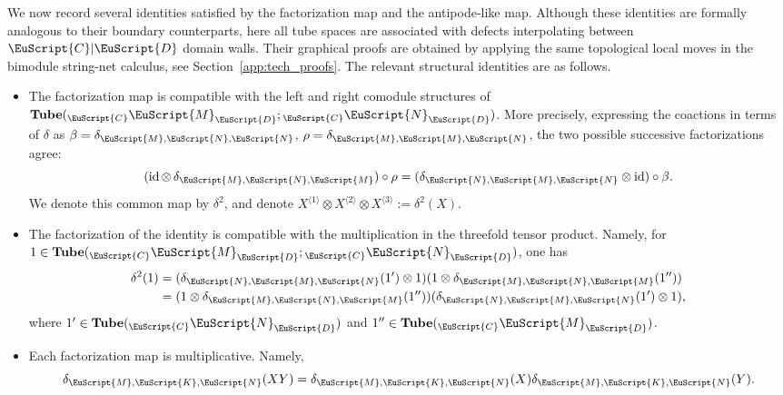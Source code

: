 \documentclass[a4paper,11pt]{article}
\theoremstyle{definition}
\theoremstyle{remark}
\newcommand\eC           {\EuScript{C}}
\newcommand\eD           {\EuScript{D}}
\newcommand\eK         {\EuScript{K}}
\newcommand\eM          {\EuScript{M}}
\newcommand\eN         {\EuScript{N}}
\newcommand{\id}{\operatorname{id}}
\newcommand{\Tube}{\mathbf{Tube}}
\begin{document}
We now record several identities satisfied by the factorization map and the antipode-like map. Although these identities are formally analogous to their boundary counterparts, here all tube spaces are associated with defects interpolating between $\eC|\eD$ domain walls. Their graphical proofs are obtained by applying the same topological local moves in the bimodule string-net calculus, see Section~\ref{app:tech_proofs}. The relevant structural identities are as follows.



\begin{itemize}
    \item
    The factorization map is compatible with the left and right comodule structures of $\Tube({}_{\eC}\eM_{\eD};{}_{\eC}\eN_{\eD})$. More precisely, expressing the coactions in terms of $\delta$ as $\beta = \delta_{\eM,\eN,\eN}$, $\rho = \delta_{\eM,\eM,\eN}$, the two possible successive factorizations agree:
    \begin{equation} \label{eq:coassociativity-DW}
        (\id\otimes\,\delta_{\eM,\eN,\eM})\circ\rho = (\delta_{\eN,\eM,\eN}\otimes\id)\circ\beta.
    \end{equation}
    We denote this common map by $\delta^2$, and denote $X^{\langle 1 \rangle} \otimes X^{\langle 2\rangle} \otimes X^{\langle 3\rangle} := \delta^2(X)$. 

    \item
    The factorization of the identity is compatible with the multiplication in the threefold tensor product. Namely, for $1\in \Tube({}_{\eC}\eM_{\eD};{}_{\eC}\eN_{\eD})$, one has
    \begin{equation} \label{eq:unit-trifold-DW}
    \begin{aligned}
         \delta^2(1)&=(\delta_{\eN,\eM,\eN}(1') \otimes 1) (1\otimes \delta_{\eM,\eN,\eM}(1''))\\
         &=(1\otimes \delta_{\eM,\eN,\eM}(1'')) (\delta_{\eN,\eM,\eN}(1') \otimes 1),
    \end{aligned}
    \end{equation}
    where $1'\in\Tube({}_\eC\eN_\eD)$ and $1''\in\Tube({}_\eC\eM_\eD)$. 
    \item
    Each factorization map is multiplicative. Namely, 
    \begin{equation} \label{eq:preserve-product-DW}
        \delta_{\eM,\eK,\eN}(XY) = \delta_{\eM,\eK,\eN}(X) \delta_{\eM,\eK,\eN}(Y).
    \end{equation}


\end{itemize}
\end{document}
